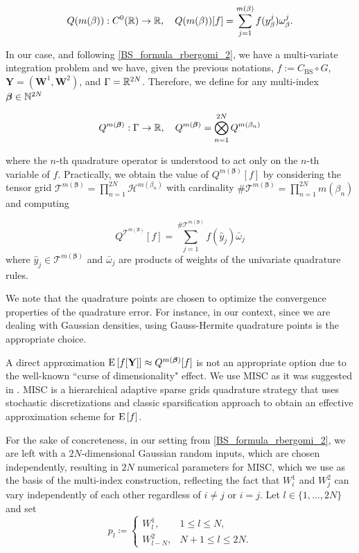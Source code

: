 \begin{equation}
Q(m(\beta)):C^0(\mathbb{R}) \rightarrow \mathbb{R}, \quad Q(m(\beta))[f]= \sum_{j=1}^{m(\beta)} f(y^j_\beta) \omega_\beta^j.
\end{equation}





In our case, and following \eqref{BS_formula_rbergomi_2}, we have a multi-variate integration problem and  we have, given the previous notations,    $f:=C_{\text{BS}}\circ G$, $\mathbf{Y}=(\mathbf{W}^1,\mathbf{W}^2)$, and  $\Gamma=\mathbb{R}^{2N}$.  Therefore,  we define for any multi-index $\boldsymbol{\beta} \in \mathbb{N}^{2N}$

$$Q^{m(\boldsymbol{\beta})}: \Gamma \rightarrow \mathbb{R},\quad  Q^{m(\boldsymbol{\beta})}= \bigotimes_{n = 1}^{2N} Q^{m(\beta_n)} $$

where the $n$-th quadrature operator is understood to act only on the $n$-th variable of $f$. Practically, we obtain the value of $Q^{m(\boldsymbol{\beta})}[f]$  by considering the tensor grid $\mathcal{T}^{m(\boldsymbol{\beta})}= \prod_{n = 1}^{2N}  \mathcal{H}^{m(\beta_n)}$ with cardinality $\#\mathcal{T}^{m(\boldsymbol{\beta})}=\prod_{n=1}^{2N} m (\beta_n)$ and computing

$$ Q^{\mathcal{T}^{m(\boldsymbol{\beta})}}[f]= \sum_{j=1}^{\#\mathcal{T}^{m(\boldsymbol{\beta})}} f(\hat{y}_j) \bar{\omega}_j$$
where $\hat{y}_j \in \mathcal{T}^{m(\boldsymbol{\beta})}$ and $\bar{\omega}_j$ are  products of weights of the univariate quadrature rules.
\begin{remark}
We note that the quadrature points are chosen to optimize the convergence properties of the quadrature error.  For instance, in our context, since we are dealing with Gaussian densities, using Gauss-Hermite quadrature points is the appropriate choice.
\end{remark}

A direct approximation $\mathrm{E}\left[f[\mathbf{Y}]\right] \approx Q^{m(\boldsymbol{\beta})}[f]$ is not an appropriate option  due to the well-known ``curse of dimensionality" effect. We use MISC as it was suggested  in \cite{haji2016multi}. MISC is a hierarchical adaptive sparse grids quadrature strategy that uses  stochastic discretizations  and classic sparsification approach to obtain an effective approximation scheme for $\mathrm{E}\left[f\right]$. 

 For the sake
of concreteness, in our setting from \eqref{BS_formula_rbergomi_2}, we are left with a $2N$-dimensional Gaussian random inputs, which are chosen independently, resulting in  $2N$ numerical parameters for MISC, which we use as the basis of the multi-index construction, reflecting the fact that $W^1_i$ and $W^2_j$ can vary independently of each other regardless of $i \neq j$ or $i = j$. Let $l \in \{1, \ldots, 2N\}$ and set
\begin{equation}
p_l \coloneqq
\begin{cases}
W^1_l, & 1 \le l \le N,\\
W^2_{l-N}, & N+1 \le l \le 2N.
\end{cases}
\end{equation}



